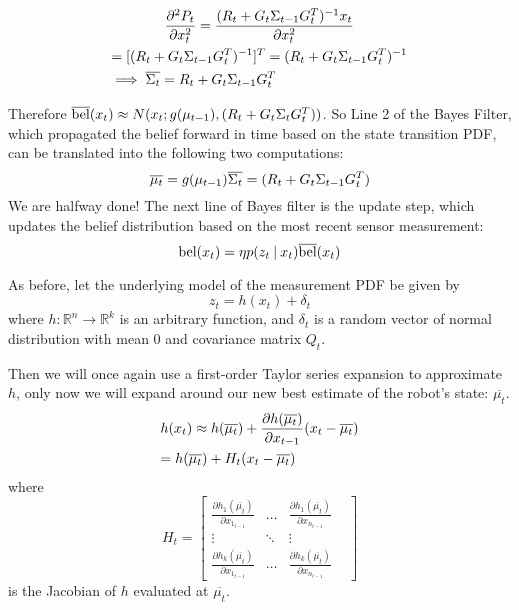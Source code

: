 \begin{multline*}
\frac{\partial^2 P_t }{\partial x_t^2} = \frac{(R_t + G_t\Sigma_{t-1}G_t^T)^{-1}x_t}{\partial x_t^2} \\
= [(R_t + G_t\Sigma_{t-1}G_t^T)^{-1}]^T = (R_t + G_t\Sigma_{t-1}G_t^T)^{-1} \\
\implies \overline{\Sigma_t} = R_t + G_t\Sigma_{t-1}G_t^T \hfill
\end{multline*}

Therefore \(\overline{\mathrm{bel}}(x_t) \approx N(x_t;g(\mu_{t-1}),(R_t + G_t\Sigma_tG_t^T))\). So Line 2 of the Bayes Filter, which propagated the belief forward in time based on the state transition PDF, can be translated into the following two computations:
\[
\overline{\mu_t} = g(\mu_{t-1}) \\
\overline{\Sigma_t} = (R_t + G_t\Sigma_{t-1}G_t^T)
\]
We are halfway done! The next line of Bayes filter is the update step, which updates the belief distribution based on the most recent sensor measurement:
\[
\mathrm{bel}(x_t) = \eta p(z_t \mathbin{\vert} x_t) \overline{\mathrm{bel}}(x_t)
\]

As before, let the underlying model of the measurement PDF be given by \[z_t =  h(x_t) + \delta_t\] where \(h: \mathbb{R}^n \to \mathbb{R}^k\) is an arbitrary function, and \(\delta_t\) is a random vector of normal distribution with mean 0 and covariance matrix \(Q_t\).

Then we will once again use a first-order Taylor series expansion to approximate \(h\), only now we will expand around our new best estimate of the robot's state: \(\overline{\mu_t}\).
\begin{multline*}
h(x_t) \approx h(\overline{\mu_t}) + \frac{\partial h(\overline{\mu_t})}{\partial x_{t-1}} (x_t - \overline{\mu_t}) \\
= h(\overline{\mu_t}) + H_t (x_t - \overline{\mu_t}) \hfill
\end{multline*}
where \[
H_t = \begin{bmatrix} 
\frac{\partial h_1(\overline{\mu_t})}{\partial x_{1_{t-1}}} & \dots & \frac{\partial h_1(\overline{\mu_t})}{\partial x_{n_{t-1}}}\\
\vdots & \ddots & \vdots & \\
\frac{\partial h_k(\overline{\mu_t})}{\partial x_{1_{t-1}}} & \dots & \frac{\partial h_k(\overline{\mu_t})}{\partial x_{n_{t-1}}} 
\end{bmatrix} \] is the Jacobian of \(h\) evaluated at \(\overline{\mu_t}\).

